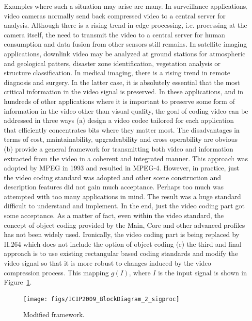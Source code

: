 \documentclass{article}
\begin{document}
Examples where such a situation may arise are many.  In surveillance applications, video cameras normally send back compressed video to a central server for analysis.  Although there is a rising trend in edge processing, i.e. processing at the camera itself, the need to transmit the video to a central server for human consumption and data fusion from other sensors still remains.  In satellite imaging applications, downlink video may be analyzed at ground stations for atmospheric and geological patters, disaster zone identification, vegetation analysis or structure classification.  In medical imaging, there is a rising trend in remote diagnosis and surgery.  In the latter case, it is absolutely essential that the most critical information in the video signal is preserved.  In these applications, and in hundreds of other applications where it is important to preserve some form of information in the video other than visual quality, the goal of coding video can be addressed in three ways (a) design a video codec tailored for each application that efficiently concentrates bits where they matter most.  The disadvantages in terms of cost, maintainability, upgradeability and cross operability are obvious (b) provide a general framework for transmitting both video and information extracted from the video in a coherent and integrated manner.  This approach was adopted by MPEG in 1993 and resulted in MPEG-4.  However, in practice, just the video coding standard was adopted and other scene construction and description features did not gain much acceptance.  Perhaps too much was attempted with too many applications in mind.  The result was a huge standard difficult to understand and implement.  In the end, just the video coding part got some acceptance.  As a matter of fact, even within the video standard, the concept of object coding provided by the Main, Core and other advanced profiles has not been widely used.  Ironically, the video coding part is being replaced by H.264 which does not include the option of object coding (c) the third and final approach is to use existing rectangular based coding standards and modify the video signal so that it is more robust to changes induced by the video compression process.  This mapping $g(I)$, where $I$ is the input signal is shown in Figure~\ref{fig:SolutionThroughSigProc}.  

\begin{figure}[h]
			\centering
			\texttt{[image: figs/ICIP2009\_BlockDiagram\_2\_sigproc]}
			\caption{Modified framework.}
			\label{fig:SolutionThroughSigProc}
\end{figure}
\end{document}
